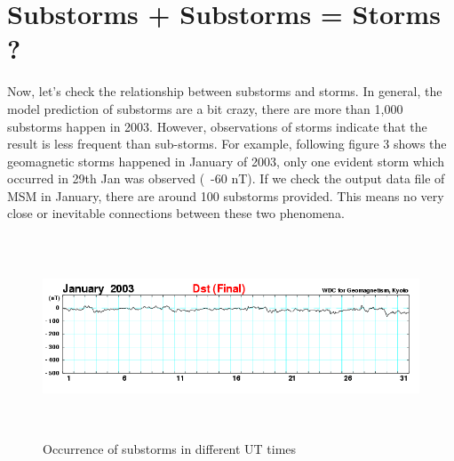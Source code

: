 \documentclass[12pt, letterpaper]{article} %
\begin{document}
\section{Substorms + Substorms = Storms ?} %

Now, let's check the relationship between substorms and storms. In general, the model prediction of substorms are a bit crazy, there are more than 1,000 substorms happen in 2003. However, observations of storms indicate that the result is less frequent than sub-storms. For example, following figure 3 shows the geomagnetic storms happened in January of 2003, only one evident storm which occurred in 29th Jan was observed (~-60 nT). If we check the output data file of MSM in January, there are around 100 substorms provided. This means no very close or inevitable connections between these two phenomena.

\begin{figure}[!t] %
\begin{center} %
  \includegraphics[width=15cm,height=6cm]{dst_200301.png} %
  \caption{Occurrence of substorms in different UT times} %
  \label{fig:3} %
\end{center} %
\end{figure} %



\clearpage %

\end{document}
